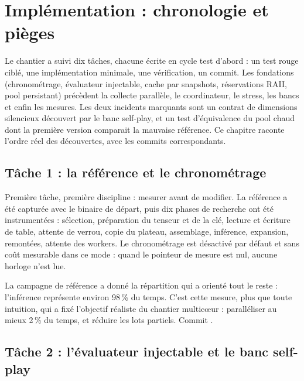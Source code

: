 \section{Impl\'ementation : chronologie et pi\`eges}
\label{sec:implementation}

\begin{resume}
Le chantier a suivi dix t\^aches, chacune \'ecrite en cycle test d'abord :
un test rouge cibl\'e, une impl\'ementation minimale, une v\'erification, un
commit. Les fondations (chronom\'etrage, \'evaluateur injectable, cache par
snapshots, r\'eservations RAII, pool persistant) pr\'ec\`edent la collecte
parall\`ele, le coordinateur, le stress, les bancs et enfin les mesures. Les
deux incidents marquants sont un contrat de dimensions silencieux d\'ecouvert
par le banc self-play, et un test d'\'equivalence du pool chaud dont la
premi\`ere version comparait la mauvaise r\'ef\'erence. Ce chapitre raconte
l'ordre r\'eel des d\'ecouvertes, avec les commits correspondants.
\end{resume}

\subsection{T\^ache 1 : la r\'ef\'erence et le chronom\'etrage}
\label{sec:t1}

Premi\`ere t\^ache, premi\`ere discipline : mesurer avant de modifier. La
r\'ef\'erence a \'et\'e captur\'ee avec le binaire de d\'epart, puis dix
phases de recherche ont \'et\'e instrument\'ees : s\'election, pr\'eparation du
tenseur et de la cl\'e, lecture et \'ecriture de table, attente de verrou,
copie du plateau, assemblage, inf\'erence, expansion, remont\'ees, attente
des workers. Le chronom\'etrage est d\'esactiv\'e par d\'efaut et sans co\^ut
mesurable dans ce mode : quand le pointeur de mesure est nul, aucune horloge
n'est lue.

La campagne de r\'ef\'erence a donn\'e la r\'epartition qui a orient\'e tout
le reste : l'inf\'erence repr\'esente environ 98\,\% du temps. C'est cette
mesure, plus que toute intuition, qui a fix\'e l'objectif r\'ealiste du
chantier multic\oe{}ur : parall\'eliser au mieux 2\,\% du temps, et r\'eduire
les lots partiels. Commit .

\subsection{T\^ache 2 : l'\'evaluateur injectable et le banc self-play}
\label{sec:t2}


